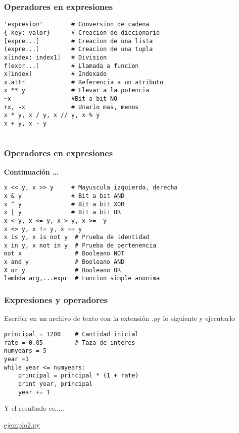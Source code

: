 \documentclass[10pt]{beamer}
\begin{document}
\begin{frame}[fragile]
\frametitle{Operadores en expresiones}

\begin{lstlisting}
'expresion'        # Conversion de cadena
{ key: valor}      # Creacion de diccionario
[expre...]         # Creacion de una lista
(expre...)         # Creacion de una tupla
x[index: index1]   # Division
f(expr...)         # Llamada a funcion
x[index]           # Indexado
x.attr             # Referencia a un atributo
x ** y             # Elevar a la potencia
~x                 #Bit a bit NO
+x, -x             # Unario mas, menos
x * y, x / y, x // y, x % y
x + y, x - y


\end{lstlisting}
\end{frame}

\begin{frame}[fragile]
\frametitle{Operadores en expresiones}

\textbf{Continuaci\'on \dots }

\vspace{0.2cm}


\begin{lstlisting}
x << y, x >> y     # Mayuscula izquierda, derecha
x & y              # Bit a bit AND
x ^ y              # Bit a bit XOR
x | y              # Bit a bit OR
x < y, x <= y, x > y, x >=  y
x <> y, x != y, x == y
x is y, x is not y  # Prueba de identidad
x in y, x not in y  # Prueba de pertenencia
not x               # Booleano NOT
x and y             # Booleano AND
X or y              # Booleano OR
lambda arg,...expr  # Funcion simple anonima
\end{lstlisting}
\end{frame}


\begin{frame}[fragile]
\frametitle{Expresiones y operadores}
\vspace{0.2cm}

Escribir en un archivo de texto con la extensi\'on .py lo siguiente y ejecutarlo

\vspace{0.3cm}


\begin{lstlisting}
principal = 1200    # Cantidad inicial 
rate = 0.05         # Taza de interes
numyears = 5        
year =1
while year <= numyears:
    principal = principal * (1 + rate)
    print year, principal
    year += 1
\end{lstlisting}

\vspace{0.3cm}

Y el resultado es.....

\vspace{0.2cm}

\href{run:ejemplo1.py}{\underline{ejemplo2.py}}
\end{frame}
\end{document}
